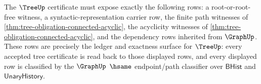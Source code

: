 \begin{theorem}
\label{thm:tree-obligation-root-ledger-exactness}
The $\TreeUp$ certificate must expose exactly the following rows: a
root-or-root-free witness, a syntactic-representation carrier row, the finite
path witnesses of \autoref{thm:tree-obligation-connected-acyclic}, the
acyclicity witnesses of \autoref{thm:tree-obligation-connected-acyclic}, and
the dependency rows inherited from $\GraphUp$. These rows are precisely the
ledger and exactness surface for $\TreeUp$: every accepted tree certificate is
read back to those displayed rows, and every displayed row is classified by
the $\GraphUp$ $\hsame$ endpoint/path classifier over $\mathsf{BHist}$ and
$\mathsf{UnaryHistory}$.
\end{theorem}
